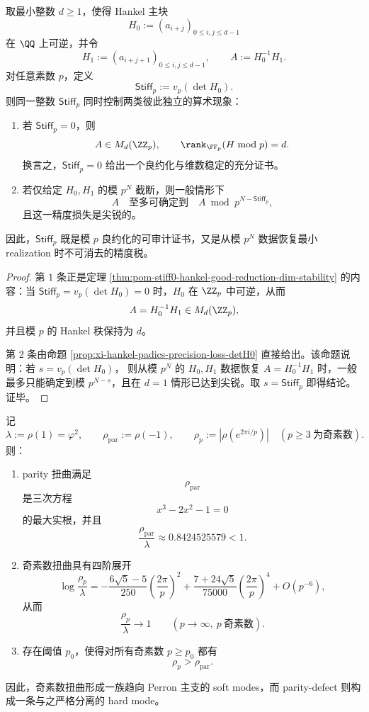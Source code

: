 \begin{theorem}\label{thm:conclusion-hankel-stiffness-dual-role}
取最小整数 \(d\ge 1\)，使得 Hankel 主块
\[
H_0:=(a_{i+j})_{0\le i,j\le d-1}
\]
在 \(\QQ\) 上可逆，并令
\[
H_1:=(a_{i+j+1})_{0\le i,j\le d-1},
\qquad
A:=H_0^{-1}H_1.
\]
对任意素数 \(p\)，定义
\[
\mathsf{Stiff}_p:=v_p(\det H_0).
\]
则同一整数 \(\mathsf{Stiff}_p\) 同时控制两类彼此独立的算术现象：
\begin{enumerate}
  \item 若 \(\mathsf{Stiff}_p=0\)，则
  \[
  A\in M_d(\ZZ_p),
  \qquad
  \rank_{\FF_p}(H\bmod p)=d.
  \]
  换言之，\(\mathsf{Stiff}_p=0\) 给出一个良约化与维数稳定的充分证书。
  \item 若仅给定 \(H_0,H_1\) 的模 \(p^N\) 截断，则一般情形下
  \[
  A
  \quad\text{至多可确定到}\quad
  A\bmod p^{N-\mathsf{Stiff}_p},
  \]
  且这一精度损失是尖锐的。
\end{enumerate}
因此，\(\mathsf{Stiff}_p\) 既是模 \(p\) 良约化的可审计证书，又是从模 \(p^N\) 数据恢复最小 realization 时不可消去的精度税。
\end{theorem}

\begin{proof}
第 \(1\) 条正是定理 \ref{thm:pom-stiff0-hankel-good-reduction-dim-stability} 的内容：当
\(
\mathsf{Stiff}_p=v_p(\det H_0)=0
\)
时，\(H_0\) 在 \(\ZZ_p\) 中可逆，从而
\[
A=H_0^{-1}H_1\in M_d(\ZZ_p),
\]
并且模 \(p\) 的 Hankel 秩保持为 \(d\)。

第 \(2\) 条由命题 \ref{prop:xi-hankel-padics-precision-loss-detH0} 直接给出。该命题说明：若
\(
s=v_p(\det H_0)
\)，
则从模 \(p^N\) 的 \(H_0,H_1\) 数据恢复
\(
A=H_0^{-1}H_1
\)
时，一般最多只能确定到模 \(p^{N-s}\)，且在 \(d=1\) 情形已达到尖锐。取 \(s=\mathsf{Stiff}_p\) 即得结论。证毕。
\end{proof}

\begin{theorem}\label{thm:conclusion-parity-defect-hard-isolated-spectral-phase}
记
\[
\lambda:=\rho(1)=\varphi^2,
\qquad
\rho_{\mathrm{par}}:=\rho(-1),
\qquad
\rho_p:=\left|\rho\!\left(e^{2\pi i/p}\right)\right|
\quad
(p\ge 3\ \text{为奇素数}).
\]
则：
\begin{enumerate}
  \item parity 扭曲满足
  \[
  \rho_{\mathrm{par}}
  \]
  是三次方程
  \[
  x^3-2x^2-1=0
  \]
  的最大实根，并且
  \[
  \frac{\rho_{\mathrm{par}}}{\lambda}\approx 0.8424525579<1.
  \]
  \item 奇素数扭曲具有四阶展开
  \[
  \log\frac{\rho_p}{\lambda}
  =
  -\frac{6\sqrt5-5}{250}\left(\frac{2\pi}{p}\right)^2
  +\frac{7+24\sqrt5}{75000}\left(\frac{2\pi}{p}\right)^4
  +O(p^{-6}),
  \]
  从而
  \[
  \frac{\rho_p}{\lambda}\to 1
  \qquad
  (p\to\infty,\ p\ \text{奇素数}).
  \]
  \item 存在阈值 \(p_0\)，使得对所有奇素数 \(p\ge p_0\) 都有
  \[
  \rho_p>\rho_{\mathrm{par}}.
  \]
\end{enumerate}
因此，奇素数扭曲形成一族趋向 Perron 主支的 soft modes，而 parity-defect 则构成一条与之严格分离的 hard mode。
\end{theorem}

